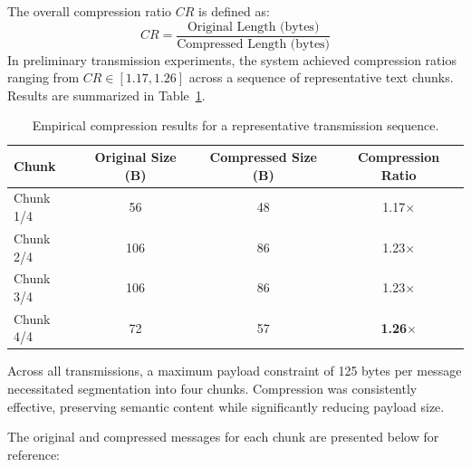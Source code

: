 \documentclass[12pt,openany]{article}
\theoremstyle{definition}
\theoremstyle{definition}
\theoremstyle{definition}
\begin{document}
The overall compression ratio $CR$ is defined as:
\[
CR = \frac{\text{Original Length (bytes)}}{\text{Compressed Length (bytes)}}
\]
In preliminary transmission experiments, the system achieved compression ratios ranging from $CR \in [1.17, 1.26]$ across a sequence of representative text chunks. Results are summarized in Table~\ref{tab:compression-results}.

\begin{table}[ht]
\centering
\begin{tabular}{|l|c|c|c|}
\hline
\textbf{Chunk} & \textbf{Original Size (B)} & \textbf{Compressed Size (B)} & \textbf{Compression Ratio} \\
\hline
Chunk 1/4  & 56  & 48  & 1.17$\times$ \\
Chunk 2/4  & 106 & 86  & 1.23$\times$ \\
Chunk 3/4  & 106 & 86  & 1.23$\times$ \\
Chunk 4/4  & 72  & 57  & \textbf{1.26$\times$} \\
\hline
\end{tabular}
\caption{Empirical compression results for a representative transmission sequence.}
\label{tab:compression-results}
\end{table}

Across all transmissions, a maximum payload constraint of 125 bytes per message necessitated segmentation into four chunks. Compression was consistently effective, preserving semantic content while significantly reducing payload size.

\vspace{1em}
\noindent
The original and compressed messages for each chunk are presented below for reference:
\end{document}

